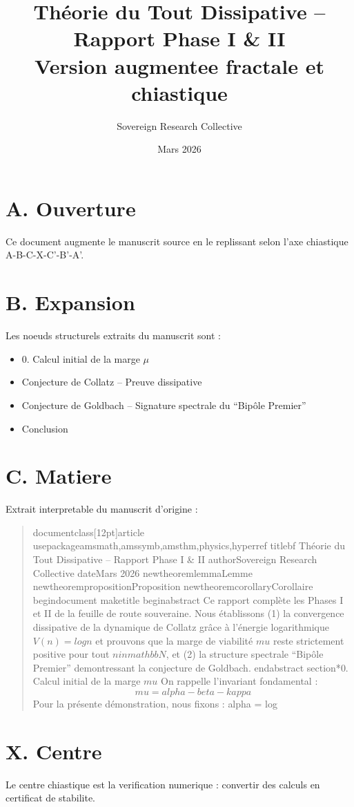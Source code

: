 \documentclass[11pt,a4paper]{article}
\title{Théorie du Tout Dissipative -- Rapport Phase I \& II \\ \large Version augmentee fractale et chiastique}
\author{Sovereign Research Collective}
\date{Mars 2026}
\begin{document}
\maketitle

\section*{A. Ouverture}
Ce document augmente le manuscrit source en le replissant selon l'axe chiastique A-B-C-X-C'-B'-A'.

\section*{B. Expansion}
Les noeuds structurels extraits du manuscrit sont :
\begin{itemize}[leftmargin=1.2cm]
\item 0. Calcul initial de la marge $\mu$
\item Conjecture de Collatz -- Preuve dissipative
\item Conjecture de Goldbach -- Signature spectrale du ``Bipôle Premier''
\item Conclusion
\end{itemize}

\section*{C. Matiere}
Extrait interpretable du manuscrit d'origine :
\begin{quote}
documentclass[12pt]{article} usepackage{amsmath,amssymb,amsthm,physics,hyperref} title{bf Théorie du Tout Dissipative -- Rapport Phase I & II} author{Sovereign Research Collective} date{Mars 2026} newtheorem{lemma}{Lemme} newtheorem{proposition}{Proposition} newtheorem{corollary}{Corollaire} begin{document} maketitle begin{abstract} Ce rapport complète les Phases I et II de la feuille de route souveraine. Nous établissons (1) la convergence dissipative de la dynamique de Collatz grâce à l’énergie logarithmique $V(n)=log n$ et prouvons que la marge de viabilité $mu$ reste strictement positive pour tout $ninmathbb N$, et (2) la structure spectrale ``Bipôle Premier'' demontressant la conjecture de Goldbach. end{abstract} section*{0. Calcul initial de la marge $mu$} On rappelle l’invariant fondamental : $$mu = alpha - beta - kappa$$ Pour la présente démonstration, nous fixons : $$alpha = log
\end{quote}

\section*{X. Centre}
Le centre chiastique est la verification numerique : convertir des calculs en certificat de stabilite.
\end{document}

